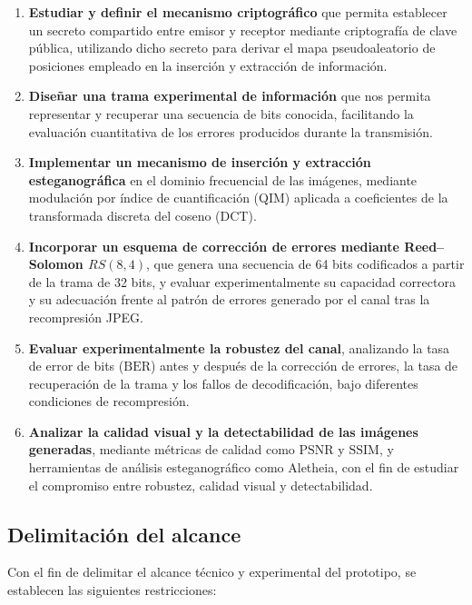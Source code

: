 \documentclass[IB]{TFUOC}%
\begin{document}
\begin{enumerate}
    \item \textbf{Estudiar y definir el mecanismo criptográfico} que permita establecer un secreto compartido entre emisor y receptor mediante criptografía de clave pública, utilizando dicho secreto para derivar el mapa pseudoaleatorio de posiciones empleado en la inserción y extracción de información.
    \item \textbf{Diseñar una trama experimental de información} que nos permita representar y recuperar una secuencia de bits conocida, facilitando la evaluación cuantitativa de los errores producidos durante la transmisión.
    \item \textbf{Implementar un mecanismo de inserción y extracción esteganográfica} en el dominio frecuencial de las imágenes, mediante modulación por índice de cuantificación (QIM) aplicada a coeficientes de la transformada discreta del coseno (DCT).
    \item \textbf{Incorporar un esquema de corrección de errores mediante Reed--Solomon $RS(8,4)$}, que genera una secuencia de 64 bits codificados a partir de la trama de 32 bits, y evaluar experimentalmente su capacidad correctora y su adecuación frente al patrón de errores generado por el canal tras la recompresión JPEG.
    \item \textbf{Evaluar experimentalmente la robustez del canal}, analizando la tasa de error de bits ($\mathrm{BER}$) antes y después de la corrección de errores, la tasa de recuperación de la trama y los fallos de decodificación, bajo diferentes condiciones de recompresión. 
    \item \textbf{Analizar la calidad visual y la detectabilidad de las imágenes generadas}, mediante métricas de calidad como $\mathrm{PSNR}$ y $\mathrm{SSIM}$, y herramientas de análisis esteganográfico como Aletheia, con el fin de estudiar el compromiso entre robustez, calidad visual y detectabilidad.
\end{enumerate}

\subsection{Delimitación del alcance}
\label{subsec:delimitacion_alcance}

Con el fin de delimitar el alcance técnico y experimental del prototipo, se establecen las siguientes restricciones:
\end{document}
